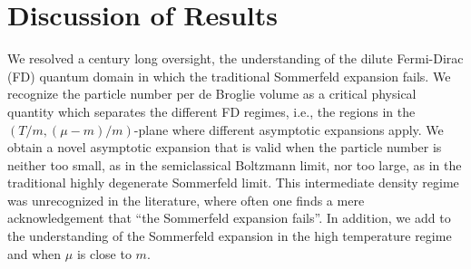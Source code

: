 \documentclass[sn-mathphys,Numbered]{sn-jnl}
\begin{document}
\section{Discussion of Results}
\label{sec:final}
We resolved a century long oversight, the understanding of the dilute Fermi-Dirac (FD) quantum  domain in which the traditional Sommerfeld expansion fails. We recognize the particle number per de Broglie volume as a  critical physical quantity which  separates the different FD regimes, i.e., the regions in the $(T/m,(\mu-m)/m)$-plane where different asymptotic expansions apply. We obtain a novel asymptotic expansion that is valid   when the particle number is neither too small, as in the semiclassical Boltzmann limit, nor too large, as in the traditional highly degenerate Sommerfeld limit. This intermediate density regime was unrecognized in the literature, where often one finds a mere acknowledgement that ``the Sommerfeld expansion fails''. In addition, we add to the understanding of the Sommerfeld expansion in the high temperature regime and when $\mu$ is close to $m$.
\end{document}
